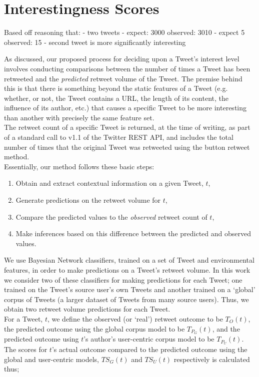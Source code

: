 \section{Interestingness Scores}


Based off reasoning that:
- two tweets
    - expect: 3000 observed: 3010
    - expect 5 observed: 15
- second tweet is more significantly interesting

As discussed, our proposed process for deciding upon a Tweet's interest level involves conducting comparisons between the number of times a Tweet has been retweeted and the \textit{predicted} retweet volume of the Tweet. The premise behind this is that there is something beyond the static features of a Tweet (e.g. whether, or not, the Tweet contains a URL, the length of its content, the influence of its author, etc.) that causes a specific Tweet to be more interesting than another with precisely the same feature set.\\
The retweet count of a specific Tweet is returned, at the time of writing, as part of a standard call to v1.1 of the Twitter REST API, and includes the total number of times that the original Tweet was retweeted using the button retweet method.\\
Essentially, our method follows these basic steps:
\begin{enumerate}
\item Obtain and extract contextual information on a given Tweet, $t$,
\item Generate predictions on the retweet volume for $t$,
\item Compare the predicted values to the \textit{observed} retweet count of $t$,
\item Make inferences based on this difference between the predicted and observed values.
\end{enumerate}
We use Bayesian Network classifiers, trained on a set of Tweet and environmental features, in order to make predictions on a Tweet's retweet volume. In this work we consider two of these classifiers for making predictions for each Tweet; one trained on the Tweet's source user's own Tweets and another trained on a `global' corpus of Tweets (a larger dataset of Tweets from many source users). Thus, we obtain two retweet volume predictions for each Tweet.\\
For a Tweet, $ t $, we define the observed (or `real') retweet outcome to be $ T_O(t) $, the predicted outcome using the global corpus model to be $ T_{P_G}(t) $, and the predicted outcome using $t$'s author's user-centric corpus model to be $ T_{P_U}(t) $. The scores for $t$'s actual outcome compared to the predicted outcome using the global and user-centric models, $ TS_G(t) $ and $ TS_U(t) $ respectively is calculated thus;


